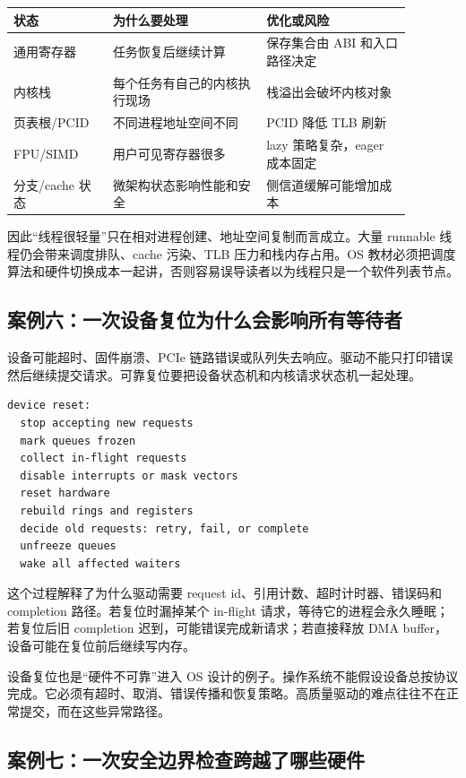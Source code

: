 \begin{longtable}{p{0.22\linewidth}p{0.34\linewidth}p{0.32\linewidth}}
\toprule
状态 & 为什么要处理 & 优化或风险 \\
\midrule
通用寄存器 & 任务恢复后继续计算 & 保存集合由 ABI 和入口路径决定 \\
内核栈 & 每个任务有自己的内核执行现场 & 栈溢出会破坏内核对象 \\
页表根/PCID & 不同进程地址空间不同 & PCID 降低 TLB 刷新 \\
FPU/SIMD & 用户可见寄存器很多 & lazy 策略复杂，eager 成本固定 \\
分支/cache 状态 & 微架构状态影响性能和安全 & 侧信道缓解可能增加成本 \\
\bottomrule
\end{longtable}

因此“线程很轻量”只在相对进程创建、地址空间复制而言成立。大量 runnable 线程仍会带来调度排队、cache 污染、TLB 压力和栈内存占用。OS 教材必须把调度算法和硬件切换成本一起讲，否则容易误导读者以为线程只是一个软件列表节点。

\subsection{案例六：一次设备复位为什么会影响所有等待者}

设备可能超时、固件崩溃、PCIe 链路错误或队列失去响应。驱动不能只打印错误然后继续提交请求。可靠复位要把设备状态机和内核请求状态机一起处理。

\begin{lstlisting}
device reset:
  stop accepting new requests
  mark queues frozen
  collect in-flight requests
  disable interrupts or mask vectors
  reset hardware
  rebuild rings and registers
  decide old requests: retry, fail, or complete
  unfreeze queues
  wake all affected waiters
\end{lstlisting}

这个过程解释了为什么驱动需要 request id、引用计数、超时计时器、错误码和 completion 路径。若复位时漏掉某个 in-flight 请求，等待它的进程会永久睡眠；若复位后旧 completion 迟到，可能错误完成新请求；若直接释放 DMA buffer，设备可能在复位前后继续写内存。

设备复位也是“硬件不可靠”进入 OS 设计的例子。操作系统不能假设设备总按协议完成。它必须有超时、取消、错误传播和恢复策略。高质量驱动的难点往往不在正常提交，而在这些异常路径。

\subsection{案例七：一次安全边界检查跨越了哪些硬件}

